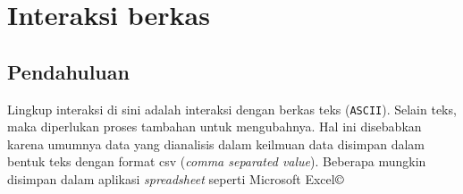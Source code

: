 \chapter{Interaksi berkas}
\section{Pendahuluan}
Lingkup interaksi di sini adalah interaksi dengan berkas teks (\texttt{ASCII}). Selain teks, maka diperlukan proses tambahan untuk mengubahnya. Hal ini disebabkan karena umumnya data yang dianalisis dalam keilmuan data disimpan dalam bentuk teks dengan format csv (\textit{comma separated value}). Beberapa mungkin disimpan dalam aplikasi \textit{spreadsheet} seperti Microsoft Excel$\copyright$
